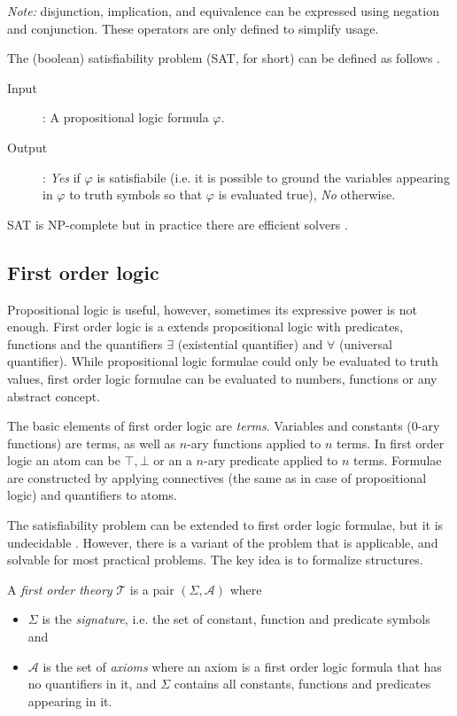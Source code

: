 \emph{Note:} disjunction, implication, and equivalence can be expressed using negation and conjunction. These operators are only defined to simplify usage.

The (boolean) satisfiability problem (SAT, for short) can be defined as follows \cite{biere2009handbook}.
\begin{description}
	\item[Input]: A propositional logic formula $\varphi$.
	\item[Output]: \emph{Yes} if $\varphi$ is satisfiabile (i.e. it is possible to ground the variables appearing in $\varphi$ to truth symbols so that $\varphi$ is evaluated true), \emph{No} otherwise.
\end{description}

SAT is NP-complete \cite{Cook71} but in practice there are efficient solvers \cite{oai:hal.archives-ouvertes.fr:hal-00868244}.

\subsection{First order logic}

Propositional logic is useful, however, sometimes its expressive power is not enough. First order logic is a extends propositional logic with predicates, functions and the quantifiers $\exists$ (existential quantifier) and $\forall$ (universal quantifier). While propositional logic formulae could only be evaluated to truth values, first order logic formulae can be evaluated to numbers, functions or any abstract concept.

The basic elements of first order logic are \emph{terms}. Variables and constants (0-ary functions) are terms, as well as $n$-ary functions applied to $n$ terms. In first order logic an atom can be $\top, \bot$ or an a $n$-ary predicate applied to $n$ terms. Formulae are constructed by applying connectives (the same as in case of propositional logic) and quantifiers to atoms.

The satisfiability problem can be extended to first order logic formulae, but it is undecidable \cite{Church36a,Turing36}. However, there is a variant of the problem that is applicable, and solvable for most practical problems. The key idea is to formalize structures.

\begin{dfn}
	A \emph{first order theory} $\mathcal{T}$ is a pair $(\Sigma,\mathcal{A})$ \cite{books/daglib/0019162} where 
	\begin{itemize}
		\item $\Sigma$ is the \emph{signature}, i.e. the set of constant, function and predicate symbols and
		\item $\mathcal{A}$ is the set of \emph{axioms} where an axiom is a first order logic formula that has no quantifiers in it, and $\Sigma$ contains all constants, functions and predicates appearing in it.
	\end{itemize}
\end{dfn}

